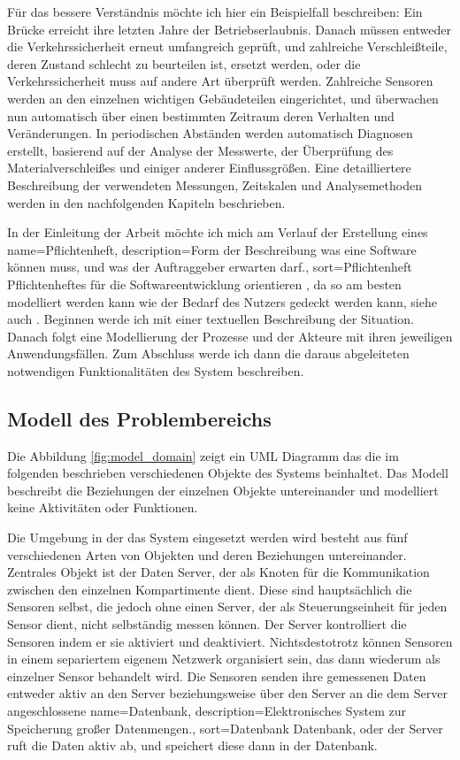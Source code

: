 Für das bessere Verständnis möchte ich hier ein Beispielfall beschreiben: Ein Brücke erreicht ihre letzten Jahre der Betriebserlaubnis. Danach müssen entweder die Verkehrssicherheit erneut umfangreich geprüft, und zahlreiche Verschleißteile, deren Zustand schlecht zu beurteilen ist, ersetzt werden, oder die Verkehrssicherheit muss auf andere Art überprüft werden. Zahlreiche Sensoren werden an den einzelnen wichtigen Gebäudeteilen eingerichtet, und überwachen nun automatisch über einen bestimmten Zeitraum deren Verhalten und Veränderungen. In periodischen Abständen werden automatisch Diagnosen erstellt, basierend auf der Analyse der Messwerte, der Überprüfung des Materialverschleißes und einiger anderer Einflussgrößen. Eine detailliertere Beschreibung der verwendeten Messungen, Zeitskalen und Analysemethoden werden in den nachfolgenden Kapiteln beschrieben.

In der Einleitung der Arbeit möchte ich mich am Verlauf der Erstellung eines 
{
  name={Pflichtenheft},
  description={Form der Beschreibung was eine Software können muss, und was der Auftraggeber erwarten darf.},
  sort=Pflichtenheft
}
\gls{Pflichtenheft}es für die Softwareentwicklung orientieren , da so am besten modelliert werden kann wie der Bedarf des Nutzers gedeckt werden kann, siehe auch \citep{gregor_engels_vorlesung_2006}. Beginnen werde ich mit einer textuellen Beschreibung der Situation. Danach folgt eine Modellierung der Prozesse und der Akteure mit ihren jeweiligen Anwendungsfällen. Zum Abschluss werde ich dann die daraus abgeleiteten notwendigen Funktionalitäten des System beschreiben.


\subsection{Modell des Problembereichs}
Die Abbildung \ref{fig:model_domain} zeigt ein  \gls{UML} Diagramm das die im folgenden beschrieben verschiedenen Objekte des Systems beinhaltet. Das Modell beschreibt die Beziehungen der einzelnen Objekte untereinander und modelliert keine Aktivitäten oder Funktionen.

Die Umgebung in der das System eingesetzt werden wird besteht aus fünf verschiedenen Arten von Objekten und deren Beziehungen untereinander. Zentrales Objekt ist der Daten \gls{Server}, der als Knoten für die Kommunikation zwischen den einzelnen Kompartimente dient. Diese sind hauptsächlich die Sensoren selbst, die jedoch ohne einen \gls{Server}, der als Steuerungseinheit für jeden Sensor dient, nicht selbständig messen können. Der \gls{Server} kontrolliert die Sensoren indem er sie aktiviert und deaktiviert. Nichtsdestotrotz können Sensoren in einem separiertem eigenem Netzwerk organisiert sein, das dann wiederum als einzelner Sensor behandelt wird. Die Sensoren senden ihre gemessenen Daten entweder aktiv an den \gls{Server} beziehungsweise über den \gls{Server} an die dem \gls{Server} angeschlossene 
{
  name={Datenbank},
  description={Elektronisches System zur Speicherung großer Datenmengen.},
  sort=Datenbank
}
\gls{Datenbank}, oder der \gls{Server} ruft die Daten aktiv ab, und speichert diese dann in der Datenbank.

